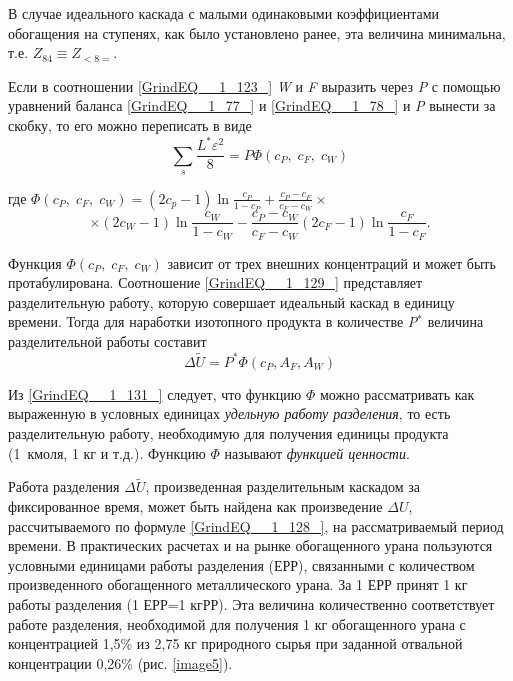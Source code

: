 В случае идеального каскада с малыми одинаковыми коэффициентами обогащения на ступенях, как было установлено ранее, эта величина минимальна, т.е. $Z_{84} \equiv Z_{<8=} $.

Если в соотношении \ref{GrindEQ__1_123_} \textit{W} и \textit{F} выразить через \textit{P} с помощью уравнений баланса \ref{GrindEQ__1_77_} и \ref{GrindEQ__1_78_} и \textit{P} вынести за скобку, то его можно переписать в виде
\begin{equation} \label{GrindEQ__1_129_} 
\sum _{s}\frac{L^{*} \varepsilon ^{2} }{8}  =P\Phi (c_{P} ,\; c_{F} ,\; c_{W} ) 
\end{equation} 

где  $\Phi (c_{P} ,\; c_{F} ,\; c_{W} )=(2c_{p} -1)\ln \frac{c_{P} }{1-c_{P} } +\frac{c_{P} -c_{F} }{c_{F} -c_{W} } \times $
\begin{equation} \label{GrindEQ__1_130_} 
\times (2c_{W} -1)\ln \frac{c_{W} }{1-c_{W} } -\frac{c_{P} -c_{W} }{c_{F} -c_{W} } (2c_{F} -1)\ln \frac{c_{F} }{1-c_{F} } .              
\end{equation} 

Функция $\Phi (c_{P} ,\; c_{F} ,\; c_{W} )$ зависит от трех внешних концентраций и может быть протабулирована. Соотношение \ref{GrindEQ__1_129_} представляет разделительную работу, которую совершает идеальный каскад в единицу времени. Тогда для наработки изотопного продукта в количестве \textit{P}${}^{*}$ величина разделительной работы составит
\begin{equation} \label{GrindEQ__1_131_} 
\Delta \tilde{U}=P^{*} \Phi (c_{{P} } ,A_{F} ,A_{W} ) 
\end{equation} 

Из \ref{GrindEQ__1_131_} следует, что функцию $\Phi $ можно рассматривать как выраженную в условных единицах \textit{удельную работу разделения}, то есть разделительную работу, необходимую для получения единицы продукта (1~кмоля, 1 кг и т.д.). Функцию $\Phi $ называют \textit{функцией ценности}.

Работа разделения $\Delta \tilde{U}$, произведенная разделительным каскадом за фиксированное время, может быть найдена как произведение $\Delta U$, рассчитываемого по формуле \ref{GrindEQ__1_128_}, на рассматриваемый период времени. В практических расчетах и на рынке обогащенного урана пользуются условными единицами работы разделения (ЕРР), связанными с количеством произведенного обогащенного металлического урана. За 1 ЕРР принят 1 кг работы разделения (1 ЕРР=1 кгРР). Эта величина количественно соответствует работе разделения, необходимой для получения 1 кг обогащенного урана с концентрацией 1,5\% из 2,75 кг природного сырья при заданной отвальной концентрации 0,26\% (рис. \ref*{image5}).

